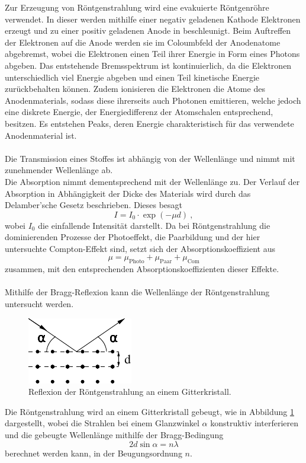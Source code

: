     Zur Erzeugung von Röntgenstrahlung wird eine evakuierte Röntgenröhre verwendet.
    In dieser werden mithilfe einer negativ geladenen Kathode Elektronen erzeugt und zu einer positiv geladenen Anode in beschleunigt.
    Beim Auftreffen der Elektronen auf die Anode werden sie im Coloumbfeld der Anodenatome abgebremst,
    wobei die Elektronen einen Teil ihrer Energie in Form eines Photons abgeben.
    Das entstehende Bremsspektrum ist kontinuierlich,
    da die Elektronen unterschiedlich viel Energie abgeben und einen Teil kinetische Energie zurückbehalten können.
    Zudem ionisieren die Elektronen die Atome des Anodenmaterials,
    sodass diese ihrerseits auch Photonen emittieren,
    welche jedoch eine diskrete Energie,
    der Energiedifferenz der Atomschalen entsprechend,
    besitzen.
    Es entstehen Peaks,
    deren Energie charakteristisch für das verwendete Anodenmaterial ist.\\
    \\
    Die Transmission eines Stoffes ist abhängig von der Wellenlänge und nimmt mit zunehmender Wellenlänge ab.\\
    Die Absorption nimmt dementsprechend mit der Wellenlänge zu.
    Der Verlauf der Absorption in Abhängigkeit der Dicke des Materials wird durch das Delamber'sche Gesetz beschrieben.
    Dieses besagt 
    \begin{equation}
        I = I_0 \cdot \exp{(-\mu d)} \ ,
    \end{equation}
    wobei $I_0$ die einfallende Intensität darstellt.
    Da bei Röntgenstrahlung die dominierenden Prozesse der Photoeffekt,
    die Paarbildung und der hier untersuchte Compton-Effekt sind,
    setzt sich der Absorptionskoeffizient aus
    \begin{equation*}
        \mu = \mu_\text{Photo} + \mu_\text{Paar} + \mu_\text{Com}
    \end{equation*}
    zusammen,
    mit den entsprechenden Absorptionskoeffizienten dieser Effekte.\\
    \\
    Mithilfe der Bragg-Reflexion kann die Wellenlänge der Röntgenstrahlung untersucht werden.
    \begin{figure}[H]
       \centering
        \includegraphics[scale=1]{content/img/Abb_nonumber_bragg.pdf}
        \caption{Reflexion der Röntgenstrahlung an einem Gitterkristall.}
       \label{fig:bragg_reflexion}
    \end{figure}
    Die Röntgenstrahlung wird an einem Gitterkristall gebeugt,
    wie in Abbildung \ref{fig:bragg_reflexion} dargestellt,
    wobei die Strahlen bei einem Glanzwinkel $\alpha$ konstruktiv interferieren und die gebeugte Wellenlänge mithilfe der Bragg-Bedingung
    \begin{equation}
        2d \sin{\alpha} = n \lambda 
        \label{eqn:bragg_bedingung}
    \end{equation}
    berechnet werden kann,
    in der Beugungsordnung $n$.


